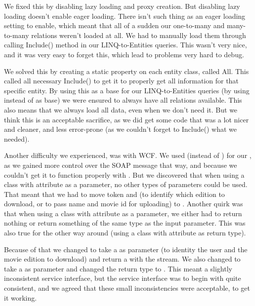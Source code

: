 We fixed this by disabling lazy loading and proxy creation. But disabling lazy loading doesn't enable eager loading. There isn't such thing as an eager loading setting to enable, which meant that all of a sudden our one-to-many and many-to-many relations weren't loaded at all. We had to manually load them through calling Include() method in our LINQ-to-Entities queries. This wasn't very nice, and it was very easy to forget this, which lead to problems very hard to debug.

We solved this by creating a static property on each entity class, called All. This called all necessary Include() to get it to properly get all information for that specific entity. By using this as a base for our LINQ-to-Entities queries (by using  instead of  as base) we were ensured to always have all relations available. This also means that we always load all data, even when we don't need it. But we think this is an acceptable sacrifice, as we did get some code that was a lot nicer and cleaner, and less error-prone (as we couldn't forget to Include() what we needed).

Another difficulty we experienced, was with WCF. We used  (instead of ) for our , as we gained more control over the SOAP message that way, and because we couldn't get it to function properly with . But we discovered that when using a class with  attribute as a parameter, no other types of parameters could be used. That meant that we had to move token and  (to identify which edition to download, or to pass name and movie id for uploading) to . Another quirk was that when using a class with  attribute as a parameter, we either had to return nothing or return something of the same type as the input parameter. This was also true for the other way around (using a class with  attribute as return type).

Because of that we changed  to take a   as parameter (to identity the user and the movie edition to download) and return a   with the stream. We also changed  to take a  as parameter and changed the return type to . This meant a slightly inconsistent service interface, but the service interface was to begin with quite consistent, and we agreed that these small inconsistencies were acceptable, to get it working.